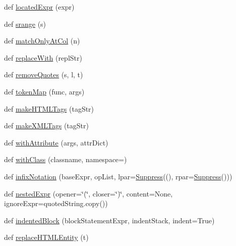 \begin{DoxyCompactItemize}
\item 
def \hyperlink{namespacepip_1_1__vendor_1_1pyparsing_a99b73f3740b470766d4ae992b5e131de}{located\+Expr} (expr)
\item 
def \hyperlink{namespacepip_1_1__vendor_1_1pyparsing_ae3ba40a5cd6b6cc5e4e12a1cf4ffde59}{srange} (s)
\item 
def \hyperlink{namespacepip_1_1__vendor_1_1pyparsing_a84aec549d8c4828a4a01d03849a1a876}{match\+Only\+At\+Col} (n)
\item 
def \hyperlink{namespacepip_1_1__vendor_1_1pyparsing_a00eff9f138fcf674b55bf2375b6293ce}{replace\+With} (repl\+Str)
\item 
def \hyperlink{namespacepip_1_1__vendor_1_1pyparsing_a0c37699ef055cd4c69d2826529e92d46}{remove\+Quotes} (s, l, t)
\item 
def \hyperlink{namespacepip_1_1__vendor_1_1pyparsing_a456ec32ba67fd5c5e3805e25c138a3d8}{token\+Map} (func, args)
\item 
def \hyperlink{namespacepip_1_1__vendor_1_1pyparsing_a892b27b01a0dd1be92cd6e5bc98a5791}{make\+H\+T\+M\+L\+Tags} (tag\+Str)
\item 
def \hyperlink{namespacepip_1_1__vendor_1_1pyparsing_aa2a2a7f2b621b5d2a3835c55b7b671a5}{make\+X\+M\+L\+Tags} (tag\+Str)
\item 
def \hyperlink{namespacepip_1_1__vendor_1_1pyparsing_a3ec3f68eb689d585377b0fa6f290d86d}{with\+Attribute} (args, attr\+Dict)
\item 
def \hyperlink{namespacepip_1_1__vendor_1_1pyparsing_a060b8574c0f73cc120aeb38aeb1f18a2}{with\+Class} (classname, namespace=\textquotesingle{}\textquotesingle{})
\item 
def \hyperlink{namespacepip_1_1__vendor_1_1pyparsing_a903af58ccce454d06c0733cf907f9220}{infix\+Notation} (base\+Expr, op\+List, lpar=\hyperlink{classpip_1_1__vendor_1_1pyparsing_1_1Suppress}{Suppress}(\textquotesingle{}(\textquotesingle{}), rpar=\hyperlink{classpip_1_1__vendor_1_1pyparsing_1_1Suppress}{Suppress}(\textquotesingle{})\textquotesingle{}))
\item 
def \hyperlink{namespacepip_1_1__vendor_1_1pyparsing_a5fe55d6b1581c8ae6ffb50f08d402474}{nested\+Expr} (opener=\char`\"{}(\char`\"{}, closer=\char`\"{})\char`\"{}, content=None, ignore\+Expr=quoted\+String.\+copy())
\item 
def \hyperlink{namespacepip_1_1__vendor_1_1pyparsing_aa7c18e89524a8f100a8cc89155a55eec}{indented\+Block} (block\+Statement\+Expr, indent\+Stack, indent=True)
\item 
def \hyperlink{namespacepip_1_1__vendor_1_1pyparsing_a39eb69a9a5c0f45c5d54771c0d7ce507}{replace\+H\+T\+M\+L\+Entity} (t)
\end{DoxyCompactItemize}
